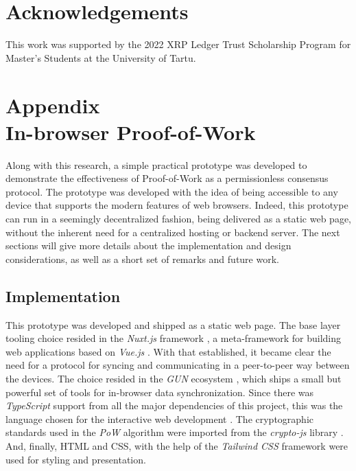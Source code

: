 \documentclass[journal]{IEEEtran}
\begin{document}
\section{Acknowledgements}

This work was supported by the 2022 XRP Ledger Trust Scholarship Program for Master's Students
at the University of Tartu.

\ifCLASSOPTIONcaptionsoff
  \newpage
\fi

{}


\section[Appendix. In-browser Proof-of-Work]{Appendix\\ {In-browser Proof-of-Work}}

Along with this research, a simple practical prototype was developed
to demonstrate the effectiveness of Proof-of-Work as a permissionless consensus protocol.
The prototype was developed with the idea of being accessible to any device that supports
the modern features of web browsers. Indeed, this prototype can run in a seemingly decentralized fashion,
being delivered as a static web page, without the inherent need for a centralized hosting or backend server.
The next sections will give more details about the implementation and design considerations, 
as well as a short set of remarks and future work.

\subsection{Implementation}

This prototype was developed and shipped as a static web page.
The base layer tooling choice resided in the \emph{Nuxt.js} framework \cite{nuxt}, a meta-framework
for building web applications based on \emph{Vue.js} \cite{vuejs}. With that established,
it became clear the need for a protocol for syncing and communicating in a 
peer-to-peer way between the devices. The choice resided in the \emph{GUN} ecosystem \cite{gundb},
which ships a small but powerful set of tools for in-browser data synchronization.
Since there was \emph{TypeScript} support from all the major dependencies of this project,
this was the language chosen for the interactive web development \cite{typescript}. The cryptographic standards used in the 
\emph{PoW} algorithm were imported from the \emph{crypto-js} library \cite{crypto-js}. And, finally, HTML and CSS, with the help
of the \emph{Tailwind CSS} framework \cite{tailwindcss} were used for styling and presentation.
\end{document}
